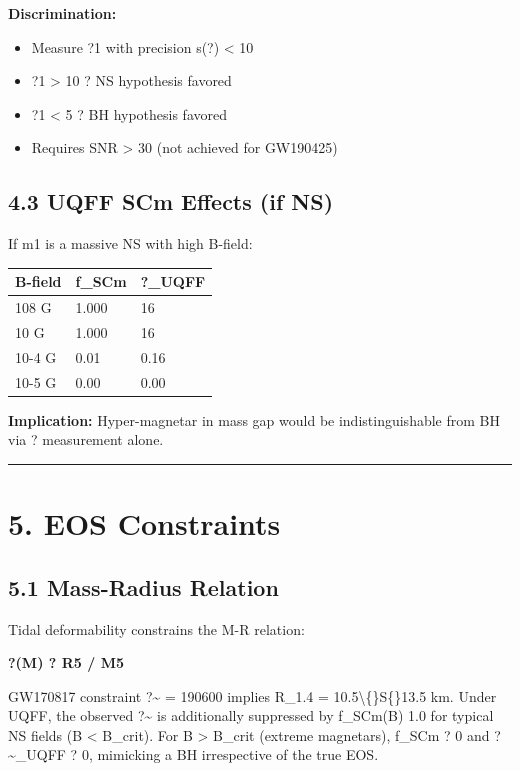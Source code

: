 \documentclass[11pt]{article}
\begin{document}
\textbf{Discrimination:}

\begin{itemize}
  \item Measure ?1 with precision s(?) < 10
  \item ?1 > 10 ? NS hypothesis favored
  \item ?1 < 5 ? BH hypothesis favored
  \item Requires SNR > 30 (not achieved for GW190425)
\end{itemize}

\subsection*{4.3 UQFF SCm Effects (if NS)}

If m1 is a massive NS with high B-field:

\begin{center}
\begin{longtable}{lll}
\toprule
B-field & f\_SCm & ?\_UQFF \tabularnewline
\midrule
\endhead
108 G & 1.000 & 16 \tabularnewline
10 G & 1.000 & 16 \tabularnewline
10-4 G & 0.01 & 0.16 \tabularnewline
10-5 G & 0.00 & 0.00 \tabularnewline
\bottomrule
\end{longtable}
\end{center}

\textbf{Implication:} Hyper-magnetar in mass gap would be indistinguishable from BH via ? measurement alone.

\noindent\rule{\textwidth}{0.4pt}

\section*{5. EOS Constraints}

\subsection*{5.1 Mass-Radius Relation}

Tidal deformability constrains the M-R relation:

\textbf{?(M) ? R5 / M5}

GW170817 constraint ?\textasciitilde{} = 190600 implies R\_1.4 = 10.5\textbackslash\{\}S\{\}13.5 km. Under UQFF, the observed ?\textasciitilde{} is additionally suppressed by f\_SCm(B)  1.0 for typical NS fields (B < B\_crit). For B > B\_crit (extreme magnetars), f\_SCm ? 0 and ?\textasciitilde{}\_UQFF ? 0, mimicking a BH irrespective of the true EOS.
\end{document}
